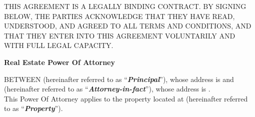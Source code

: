 
\begin{sloppypar}
THIS AGREEMENT IS A LEGALLY BINDING CONTRACT. BY SIGNING BELOW, THE PARTIES ACKNOWLEDGE THAT THEY HAVE READ, UNDERSTOOD, AND AGREED TO ALL TERMS AND CONDITIONS, AND THAT THEY ENTER INTO THIS AGREEMENT VOLUNTARILY AND WITH FULL LEGAL CAPACITY.
\end{sloppypar}

\begin{center}

\textbf{Real Estate Power Of Attorney}

\end{center}

\begin{sloppypar}
BETWEEN \PrincipalName{} (hereinafter referred to as “\textbf{\textit{Principal}}”), whose address is \PrincipalAddress{} and \AttorneyName{} (hereinafter referred to as  “\textbf{\textit{Attorney-in-fact}}”), whose address is \AttorneyAddress{}.
\\

This Power Of Attorney applies to the property located at \PropertyAddress{} (hereinafter referred to as “\textbf{\textit{Property}}”).

\end{sloppypar}

